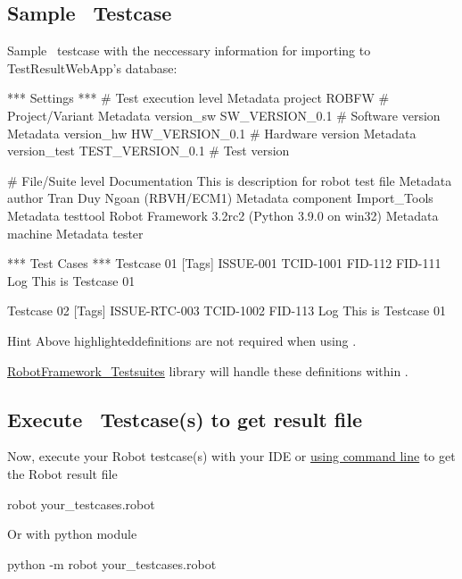 \subsection{Sample \rfwcore\ Testcase}

Sample \rfwcore\ testcase with the neccessary information for importing to 
TestResultWebApp's database:

\begin{robotcode}[caption=Sample \rfwcore\ testcase,
                  linebackgroundcolor=\hlcode{3,4,5,6,12,13,14}]
*** Settings ***
# Test execution level
Metadata   project        ROBFW              # Project/Variant
Metadata   version_sw     SW_VERSION_0.1     # Software version
Metadata   version_hw     HW_VERSION_0.1     # Hardware version
Metadata   version_test   TEST_VERSION_0.1   # Test version

# File/Suite level
Documentation             This is description for robot test file
Metadata    author        Tran Duy Ngoan (RBVH/ECM1)
Metadata    component     Import_Tools
Metadata    testtool      Robot Framework 3.2rc2 (Python 3.9.0 on win32)
Metadata    machine       %
Metadata    tester        %

*** Test Cases ***
Testcase 01
   [Tags]   ISSUE-001   TCID-1001   FID-112   FID-111
   Log       This is Testcase 01

Testcase 02
   [Tags]   ISSUE-RTC-003   TCID-1002   FID-113
   Log       This is Testcase 01
\end{robotcode}

\begin{boxhint} {Hint}
Above highlighteddefinitions are not required when using \rfw.

\href{https://github.com/test-fullautomation/robotframework-testsuitesmanagement}
{RobotFramework\_Testsuites} library will handle these definitions within .
\end{boxhint}

\subsection{Execute \rfwcore\ Testcase(s) to get result file}
Now, execute your Robot testcase(s) with your IDE or 
\href{https://robotframework.org/robotframework/latest/RobotFrameworkUserGuide.html#starting-test-execution}
{using command line} to get the Robot result file
\begin{robotlog}
robot your_testcases.robot
\end{robotlog}
Or with python module
\begin{robotlog}
python -m robot your_testcases.robot
\end{robotlog}

